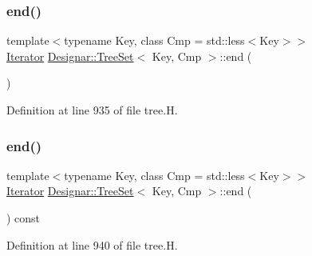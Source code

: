 \subsubsection{\texorpdfstring{end()}{end()}\hspace{0.1cm}{\footnotesize\ttfamily [1/2]}}
{\footnotesize\ttfamily template$<$typename Key, class Cmp = std\+::less$<$\+Key$>$$>$ \\
\hyperlink{class_designar_1_1_tree_set_1_1_iterator}{Iterator} \hyperlink{class_designar_1_1_tree_set}{Designar\+::\+Tree\+Set}$<$ Key, Cmp $>$\+::end (\begin{DoxyParamCaption}{ }\end{DoxyParamCaption})\hspace{0.3cm}{\ttfamily [inline]}}



Definition at line 935 of file tree.\+H.

\mbox{\label{class_designar_1_1_tree_set_a199fd4c6fa4e0ad40be0477fef024d9d}} 
\subsubsection{\texorpdfstring{end()}{end()}\hspace{0.1cm}{\footnotesize\ttfamily [2/2]}}
{\footnotesize\ttfamily template$<$typename Key, class Cmp = std\+::less$<$\+Key$>$$>$ \\
\hyperlink{class_designar_1_1_tree_set_1_1_iterator}{Iterator} \hyperlink{class_designar_1_1_tree_set}{Designar\+::\+Tree\+Set}$<$ Key, Cmp $>$\+::end (\begin{DoxyParamCaption}{ }\end{DoxyParamCaption}) const\hspace{0.3cm}{\ttfamily [inline]}}



Definition at line 940 of file tree.\+H.

\mbox{\label{class_designar_1_1_tree_set_ad620aa099eb1b4d40db8470ea6c1d5bc}} 
